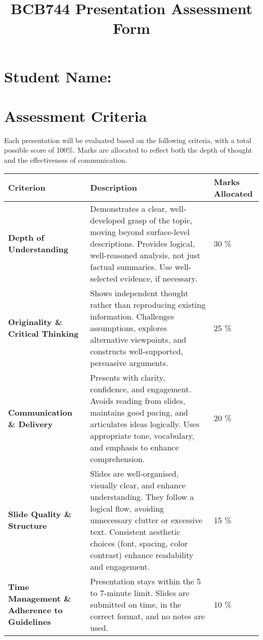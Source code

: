 \documentclass[a4paper,10pt]{article}
\title{\textbf{BCB744 Presentation Assessment Form}}
\author{}
\date{}
\begin{document}
\maketitle

\section*{Student Name: \underline{\hspace{5cm}}}

\section*{Assessment Criteria}
Each presentation will be evaluated based on the following criteria, with a total possible score of 100\%. Marks are allocated to reflect both the depth of thought and the effectiveness of communication.

{\small
\begin{longtable}{R{3.5cm} R{8.5cm} R{3cm}}
    \toprule
    \textbf{Criterion} & \textbf{Description} & \textbf{Marks Allocated} \\
    \midrule
    \textbf{Depth of Understanding} & Demonstrates a clear, well-developed grasp of the topic, moving beyond surface-level descriptions. Provides logical, well-reasoned analysis, not just factual summaries. Use well-selected evidence, if necessary. & 30 \% \\
    \textbf{Originality \& Critical Thinking} & Shows independent thought rather than reproducing existing information. Challenges assumptions, explores alternative viewpoints, and constructs well-supported, persuasive arguments. & 25 \% \\
    \textbf{Communication \& Delivery} & Presents with clarity, confidence, and engagement. Avoids reading from slides, maintains good pacing, and articulates ideas logically. Uses appropriate tone, vocabulary, and emphasis to enhance comprehension. & 20 \% \\
    \textbf{Slide Quality \& Structure} & Slides are well-organised, visually clear, and enhance understanding. They follow a logical flow, avoiding unnecessary clutter or excessive text. Consistent aesthetic choices (font, spacing, color contrast) enhance readability and engagement. & 15 \% \\
    \textbf{Time Management \& Adherence to Guidelines} & Presentation stays within the 5 to 7-minute limit. Slides are submitted on time, in the correct format, and no notes are used. & 10 \% \\
    \bottomrule
\end{longtable}}
\end{document}
